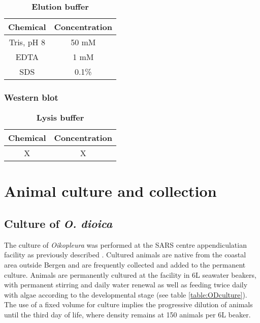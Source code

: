 \documentclass[11pt,twoside,a4paper]{report}
\begin{document}
			     \begin{table}[H]
       			\caption{\bf{Elution buffer}}
	        		\begin{center}
    		        		\begin{tabular}{|c|c|}
        		        		\hline
	    	    		        \textbf{Chemical} & \textbf{Concentration}\\
    		        		    \hline
	    	    		        Tris, pH 8 & 50 mM\\
    		        		    \hline
	    	    		        EDTA & 1 mM\\
    		        		    \hline
								SDS & 0.1\%\\
								\hline
		            \end{tabular}
    			    \end{center}
			    \end{table}
			    
			    \subsubsection{Western blot}
				\begin{table}[H]
       			\caption{\textbf{Lysis buffer}}
	        		\begin{center}
    		        		\begin{tabular}{|c|c|}
        		        		\hline
	        		        Chemical & Concentration\\
    		        		    \hline
						X & X\\
		                \hline
		            \end{tabular}
    			    \end{center}
			    \end{table}
		    		    
		    
	\section{Animal culture and collection}
		\subsection{Culture of \textit{O. dioica}}
		The culture of \textit{Oikopleura} was performed at the SARS centre appendiculatian facility as previously described \cite{Bouquet2009}. Cultured animals are native from the coastal area outside Bergen and are frequently collected and added to the permanent culture. Animals are permanently cultured at the facility in 6L seawater beakers, with permanent stirring and daily water renewal as well as feeding twice daily with algae according to the developmental stage (see table \ref{table:ODculture}). The use of a fixed volume for culture implies the progressive dilution of animals until the third day of life, where density remains at 150 animals per 6L beaker.
		
\end{document}
